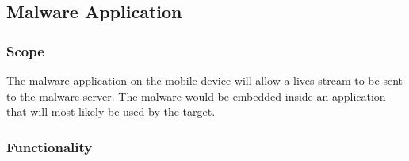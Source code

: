 
\begin{comment}
Template vir elke funksie
    \paragraph{Funksie naam}
			\begin{description}
			    \item{\textbf{Priority}:} %
			    \item{\textbf{Service Contract}:}%
			    \item{\textbf{Pre-conditions}:}%
    			    \begin{itemize}
    			        \item %
    			        \item %
    			    \end{itemize}
			    \item{\textbf{Post-conditions}:} %
    			    \begin{itemize}
    			    \item %
    			    \item %
    			    \end{itemize}
			\end{description}
			
\end{comment}




\subsection{Malware Application}

\subsubsection{Scope}
	The malware application on the mobile device will allow a lives stream to be sent to the malware server. The malware would be embedded inside an application that will most likely be used by the target.
\subsubsection{Functionality}

